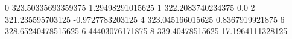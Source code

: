 0 323.50335693359375 1.29498291015625
1 322.2083740234375 0.0
2 321.235595703125 -0.9727783203125
4 323.045166015625 0.8367919921875
6 328.65240478515625 6.44403076171875
8 339.40478515625 17.1964111328125
